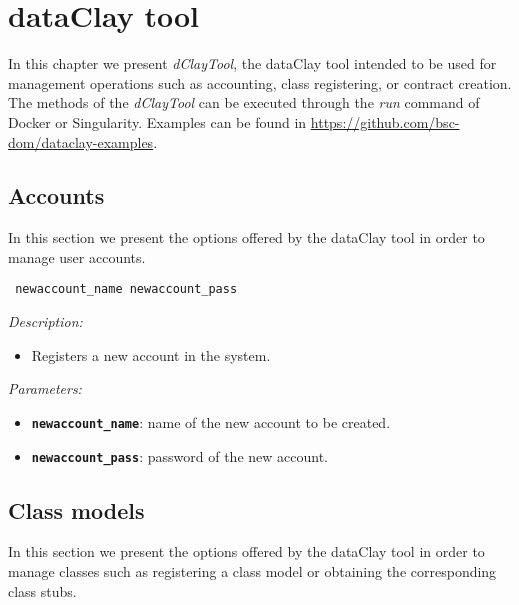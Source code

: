 
\chapter{dataClay tool}
\label{sec:dClayTool}

In this chapter we present \textit{dClayTool}, the dataClay tool intended to be used for management operations such as accounting, class registering, or contract creation. The methods of the \textit{dClayTool} can be executed through the \textit{run} command of Docker or Singularity. Examples can be found in \href{https://github.com/bsc-dom/dataclay-examples}{https://github.com/bsc-dom/dataclay-examples}.

\section{Accounts}

In this section we present the options offered by the dataClay tool in order to manage user accounts.


\begin{dBox}
\texttt{ newaccount\_name newaccount\_pass}
\LINE

{\it Description:}

\begin{itemize}
    \item Registers a new account in the system.
\end{itemize}

{\it Parameters:}

\begin{itemize}
    \item \texttt{\bfseries newaccount\_name}: name of the new account to be created.
    \item \texttt{\bfseries newaccount\_pass}: password of the new account.
\end{itemize}
 
\end{dBox}

\section{Class models}
\label{sec:newModel}

In this section we present the options offered by the dataClay tool in order to manage classes such as registering a class model or obtaining the corresponding class stubs.

